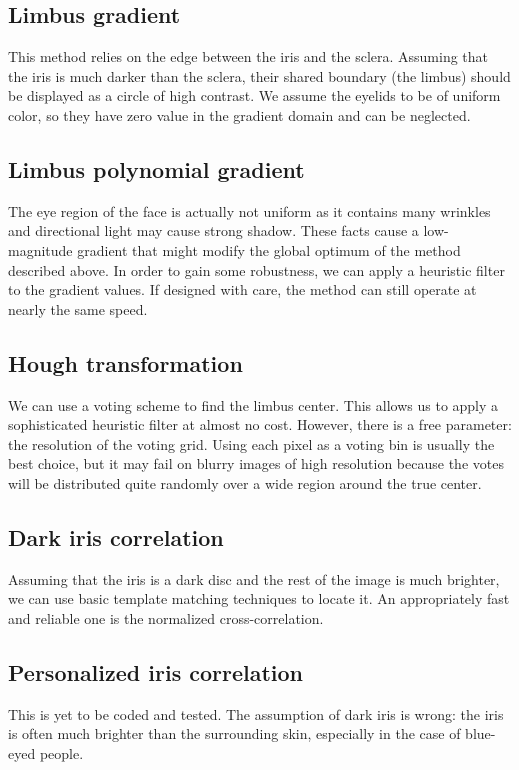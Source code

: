 \subsection{Limbus gradient}
This method relies on the edge between the iris and the sclera.
Assuming that the iris is much darker than the sclera, their shared boundary (the limbus) should be displayed as a circle of high contrast.
We assume the eyelids to be of uniform color, so they have zero value in the gradient domain and can be neglected.

\subsection{Limbus polynomial gradient}
The eye region of the face is actually not uniform as it contains many wrinkles and directional light may cause strong shadow.
These facts cause a low-magnitude gradient that might modify the global optimum of the method described above.
In order to gain some robustness, we can apply a heuristic filter to the gradient values.
If designed with care, the method can still operate at nearly the same speed.

\subsection{Hough transformation}
We can use a voting scheme to find the limbus center.
This allows us to apply a sophisticated heuristic filter at almost no cost.
However, there is a free parameter: the resolution of the voting grid.
Using each pixel as a voting bin is usually the best choice, but it may fail on blurry images of high resolution because the votes will be distributed quite randomly over a wide region around the true center.

\subsection{Dark iris correlation}
Assuming that the iris is a dark disc and the rest of the image is much brighter, we can use basic template matching techniques to locate it.
An appropriately fast and reliable one is the normalized cross-correlation.

\subsection{Personalized iris correlation}
This is yet to be coded and tested.
The assumption of dark iris is wrong: the iris is often much brighter than the surrounding skin, especially in the case of blue-eyed people.


